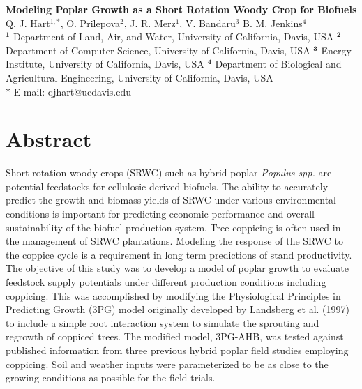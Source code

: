 \documentclass[10pt]{article}
\date{}
\newcommand{\pop}{\textit{Populus spp.} }
\begin{document}
\ifdefined\SHOWDOC
\begin{flushleft}
{\Large
\textbf{Modeling Poplar Growth as a Short Rotation Woody Crop for Biofuels}
}
\\
Q. J. Hart$^{1,\ast}$,
O. Prilepova$^{2}$,
J. R. Merz$^{1}$,
V. Bandaru$^{3}$
B. M. Jenkins$^{4}$
\\
$^{\textbf{1}}$ Department of Land, Air, and Water, University of California, Davis, USA
$^{\textbf{2}}$ Department of Computer Science, University of California, Davis, USA
$^{\textbf{3}}$ Energy Institute, University of California, Davis, USA
$^{\textbf{4}}$ Department of Biological and Agricultural Engineering, University of California, Davis, USA
\\
$\ast$ E-mail: qjhart@ucdavis.edu
\end{flushleft}


\section*{Abstract}

Short rotation woody crops (SRWC) such as hybrid poplar \pop are
potential feedstocks for cellulosic derived biofuels. The ability to accurately
predict the growth and biomass yields of SRWC under various environmental
conditions is important for predicting economic performance and overall
sustainability of the biofuel production system.  Tree coppicing is often used
in the management of SRWC plantations. Modeling the response of the SRWC to the
coppice cycle is a requirement in long term predictions of stand
productivity. The objective of this study was to develop a model of poplar
growth to evaluate feedstock supply potentials under different production
conditions including coppicing.  This was accomplished by modifying the
Physiological Principles in Predicting Growth (3PG) model originally developed
by Landsberg et al. (1997) to include a simple root interaction system to
simulate the sprouting and regrowth of coppiced trees. The modified model,
3PG-AHB, was tested against published information from three previous hybrid
poplar field studies employing coppicing.  Soil and weather inputs were
parameterized to be as close to the growing conditions as possible for the field
trials.  
\end{document}
